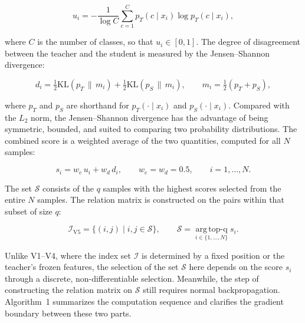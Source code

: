 \begin{equation}
\label{eq:entropy}
u_i = -\frac{1}{\log C}\sum_{c=1}^{C}
  p_T(c \mid x_i) \log p_T(c \mid x_i),
\end{equation}

where $C$ is the number of classes, so that $u_i \in [0,1]$. The
degree of disagreement between the teacher and the student is
measured by the Jensen--Shannon divergence:

\begin{equation}
\label{eq:js}
d_i = \tfrac{1}{2}\mathrm{KL}\!\left(p_T \,\|\, m_i\right)
    + \tfrac{1}{2}\mathrm{KL}\!\left(p_S \,\|\, m_i\right),
\qquad m_i = \tfrac{1}{2}\left(p_T + p_S\right),
\end{equation}

where $p_T$ and $p_S$ are shorthand for $p_T(\cdot \mid x_i)$ and
$p_S(\cdot \mid x_i)$. Compared with the $L_2$ norm, the
Jensen--Shannon divergence has the advantage of being symmetric,
bounded, and suited to comparing two probability distributions. The
combined score is a weighted average of the two quantities, computed
for all $N$ samples:

\begin{equation}
\label{eq:score}
s_i = w_e\,u_i + w_d\,d_i, \qquad w_e = w_d = 0.5,
\qquad i = 1,\ldots,N.
\end{equation}

The set $\mathcal{S}$ consists of the $q$ samples with the highest
scores selected from the entire $N$ samples. The relation matrix is
constructed on the pairs within that subset of size $q$:

\begin{equation}
\label{eq:i-v5}
\mathcal{I}_{\mathrm{V5}} = \{(i,j) \mid i,j \in \mathcal{S}\},
\qquad \mathcal{S} = \operatorname*{arg\,top\text{-}q}_{i \in \{1,\ldots,N\}} s_i.
\end{equation}

Unlike V1--V4, where the index set $\mathcal{I}$ is determined by a
fixed position or the teacher's frozen features, the selection of
the set $\mathcal{S}$ here depends on the score $s_i$ through a
discrete, non-differentiable selection. Meanwhile, the step of
constructing the relation matrix on $\mathcal{S}$ still requires
normal backpropagation. Algorithm~1 summarizes the computation
sequence and clarifies the gradient boundary between these two
parts.

